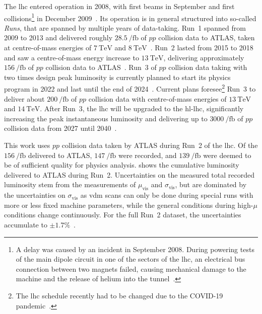 The \gls{lhc} entered operation in 2008, with first beams in September and first collisions\footnote{A delay was caused by an incident in September 2008. During powering tests of the main dipole circuit in one of the sectors of the \gls{lhc}, an electrical bus connection between two magnets failed, causing mechanical damage to the machine and the release of helium into the tunnel~\cite{Bajko:1168025}.} in December 2009~\cite{startup}.
Its operation is in general structured into so-called \textit{Runs}, that are spanned by multiple years of data-taking. Run~1 spanned from 2009 to 2013 and delivered roughly $\SI{28.5}{\per\femto\barn}$ of $pp$ collision data to ATLAS, taken at centre-of-mass energies of $\SI{7}{\TeV}$ and $\SI{8}{\TeV}$~\cite{Aaboud:2016hhf,Aad:2011dr,Aad:1517411}.
Run~2 lasted from 2015 to 2018 and saw a centre-of-mass energy increase to $\SI{13}{\TeV}$, delivering approximately $\SI{156}{\per\femto\barn}$ of $pp$ collision data to ATLAS~\cite{ATLAS-CONF-2019-021}.
Run~3 of $pp$ collision data taking with two times design peak luminosity is currently planned to start its physics program in 2022 and last until the end of 2024~\cite{run3}.
Current plans foresee\footnote{The \gls{lhc} schedule recently had to be changed due to the COVID-19 pandemic~\cite{run3}.} Run~3 to deliver about $\SI{200}{\per\femto\barn}$ of $pp$ collision data with centre-of-mass energies of $\SI{13}{\TeV}$ and $\SI{14}{\TeV}$.
After Run~3, the \gls{lhc} will be upgraded to the \gls{hl-lhc}, significantly increasing the peak instantaneous luminosity and delivering up to $\SI{3000}{\per\femto\barn}$ of $pp$ collision data from 2027 until 2040~\cite{schedule,Apollinari:2284929}. 

This work uses $pp$ collision data taken by ATLAS during Run~2 of the \gls{lhc}. Of the $\SI{156}{\per\femto\barn}$ delivered to ATLAS, $\SI{147}{\per\femto\barn}$ were recorded, and $\SI{139}{\per\femto\barn}$ were deemed to be of sufficient quality for physics analysis.
 shows the cumulative luminosity delivered to ATLAS during Run~2.
Uncertainties on the measured total recorded luminosity stem from the measurements of $\mu_\mathrm{vis}$ and $\sigma_\mathrm{vis}$, but are dominated by the uncertainties on $\sigma_\mathrm{vis}$ as \gls{vdm} scans can only be done during special runs with more or less fixed machine parameters, while the general conditions during high-$\mu$ conditions change continuously.
For the full Run~2 dataset, the uncertainties accumulate to $\pm 1.7 \%$~\cite{ATLAS-CONF-2019-021}.

